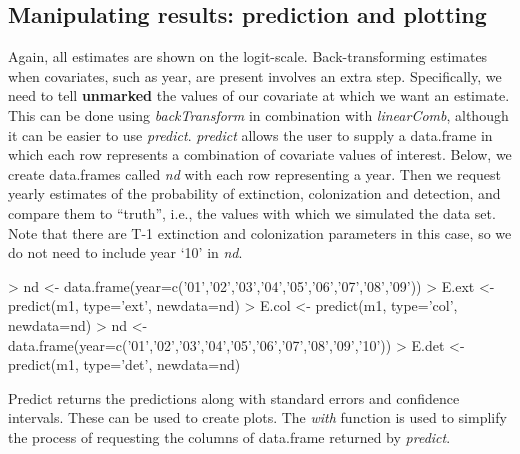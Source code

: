 \documentclass[12pt]{article}
\renewenvironment{Schunk}{\vspace{\topsep}}{\vspace{\topsep}}
\begin{document}
\subsection{Manipulating results: prediction and plotting}

Again, all estimates are shown on the logit-scale. Back-transforming
estimates when covariates, such as year, are present involves an
extra step. Specifically, we need to tell \textbf{unmarked} the values
of our covariate
at which we want an estimate. This can be done using
\emph{backTransform} in combination with \emph{linearComb}, although
it can be easier to use \emph{predict}. \emph{predict} allows the user
to supply a data.frame in which each row represents a combination of
covariate values of interest. Below, we create data.frames called
\emph{nd} with each row representing a year.
Then we request yearly estimates of the probability of extinction,
colonization and detection,
and compare them to ``truth'', i.e., the values with which we
simulated the data set. Note that there are T-1 extinction and
colonization parameters in this case, so we do not need to include
year `10' in \emph{nd}.

\begin{small}

\begin{Schunk}
\begin{Sinput}
> nd <- data.frame(year=c('01','02','03','04','05','06','07','08','09'))
> E.ext <- predict(m1, type='ext', newdata=nd)
> E.col <- predict(m1, type='col', newdata=nd)
> nd <- data.frame(year=c('01','02','03','04','05','06','07','08','09','10'))
> E.det <- predict(m1, type='det', newdata=nd)
\end{Sinput}
\end{Schunk}
\end{small}


Predict returns the predictions along with standard errors and
confidence intervals. These can be used to create plots. The
\emph{with} function is used to simplify the process of requesting the
columns of data.frame returned by \emph{predict}.
\end{document}
